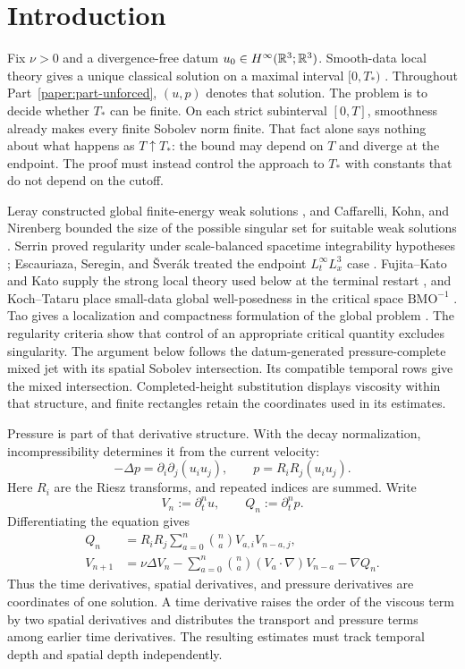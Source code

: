 \section{Introduction}
\label{u:sec:introduction}

Fix \(\nu>0\) and a divergence-free datum
\(u_0\in H^\infty(\mathbb R^3;\mathbb R^3)\).  Smooth-data local theory gives a unique
classical solution on a maximal interval \([0,T_*)\)
\cite{FujitaKato1964,Kato1984}.  Throughout Part~\ref{paper:part-unforced}, \((u,p)\) denotes that
solution.  The problem is to decide whether \(T_*\) can be finite.  On each strict
subinterval \([0,T]\), smoothness already makes every finite Sobolev norm
finite.  That fact alone says nothing about what happens as \(T\uparrow T_*\):
the bound may depend on \(T\) and diverge at the endpoint.  The proof must
instead control the approach to \(T_*\) with constants that do not depend on
the cutoff.

Leray constructed global finite-energy weak solutions \cite{Leray1934}, and
Caffarelli, Kohn, and Nirenberg bounded the size of the possible singular set
for suitable weak solutions \cite{CKN1982}.  Serrin proved regularity under
scale-balanced spacetime integrability hypotheses \cite{Serrin1962};
Escauriaza, Seregin, and \v{S}ver\'ak treated the endpoint
\(L^\infty_tL^3_x\) case \cite{ESS2003}.  Fujita--Kato and Kato supply the
strong local theory used below at the terminal restart
\cite{FujitaKato1964,Kato1984}, and Koch--Tataru place small-data
global well-posedness in the critical space \(\mathrm{BMO}^{-1}\)
\cite{KochTataru2001}.
Tao gives a localization and compactness formulation of the global problem
\cite{Tao2013}.  The regularity criteria show that control of an appropriate
critical quantity excludes singularity.  The argument below follows the datum-generated pressure-complete mixed jet
with its spatial Sobolev intersection. Its compatible temporal rows give the
mixed intersection. Completed-height substitution displays viscosity within
that structure, and finite rectangles retain the coordinates used in its
estimates.

Pressure is part of that derivative structure.  With the decay normalization,
incompressibility determines it from the current velocity:
\[
 -\Delta p=\partial_i\partial_j(u_i u_j),
 \qquad
 p=R_iR_j(u_i u_j).
\]
Here \(R_i\) are the Riesz transforms, and repeated indices are summed.
Write
\[
 V_n:=\partial_t^nu,
 \qquad
 Q_n:=\partial_t^np.
\]
Differentiating the equation gives
\begin{align}
 Q_n
 &=R_iR_j\sum_{a=0}^{n}\binom naV_{a,i}V_{n-a,j},
 \label{u:eq:intro-pressure-recurrence}\\
 V_{n+1}
 &=\nu\Delta V_n
 -\sum_{a=0}^{n}\binom na(V_a\cdot\nabla)V_{n-a}
 -\nabla Q_n.
 \label{u:eq:intro-velocity-recurrence}
\end{align}
Thus the time derivatives, spatial derivatives, and pressure derivatives are
coordinates of one solution.  A time derivative raises the order of the
viscous term by two spatial derivatives and distributes the transport and
pressure terms among earlier time derivatives.  The resulting estimates must
track temporal depth and spatial depth independently.

